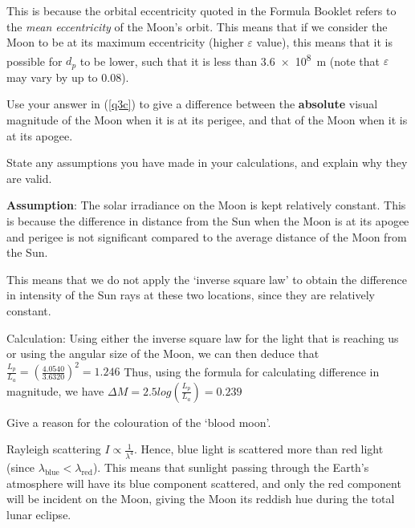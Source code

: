 \documentclass[a4paper,11pt,draft]{exam}
\begin{document}
\begin{questions}
\begin{solution}
		This is because the orbital eccentricity quoted in the Formula Booklet refers to the \textit{mean eccentricity} of the Moon’s orbit. This means that if we consider the Moon to be at its maximum eccentricity (higher $ \varepsilon $ value), this means that it is possible for $ d_p $ to be lower, such that it is less than \SI{3.6e8}{\metre} (note that $ \varepsilon $ may vary by up to 0.08).
	\end{solution}

\filbreak
\question[3]
	Use your answer in (\ref{q3c}) to give a difference between the \textbf{absolute} visual magnitude of the Moon when it is at its perigee, and that of the Moon when it is at its apogee. 
	
	State any assumptions you have made in your calculations, and explain why they are valid. 
	\droppoints
	\begin{solution}
		\textbf{Assumption}: The solar irradiance on the Moon is kept relatively constant. This is because the difference in distance from the Sun when the Moon is at its apogee and perigee is not significant compared to the average distance of the Moon from the Sun. 
		
		This means that we do not apply the `inverse square law' to obtain the difference in intensity of the Sun rays at these two locations, since they are relatively constant.
		
		Calculation: Using either the inverse square law for the light that is reaching us or using the angular size of the Moon, we can then deduce that 
		$\displaystyle \frac{L_p}{L_a}=\left(\frac{4.0540}{3.6320}\right)^2=1.246 $
		Thus, using the formula for calculating difference in magnitude, we have 
		$\displaystyle \Delta M = 2.5 log \left(\frac{L_p}{L_a}\right) = 0.239 $
	\end{solution}


\question[1]
	\vspace{-10pt}
	Give a reason for the colouration of the `blood moon'. 	
	\droppoints
	\begin{solution}
		Rayleigh scattering $\displaystyle I \propto \frac{1}{\lambda^4} $. Hence, blue light is scattered more than red light (since $ \lambda_\text{blue} < \lambda_\text{red} $).  This means that sunlight passing through the Earth's atmosphere will have its blue component scattered, and only the red component will be incident on the Moon, giving the Moon its reddish hue during the total lunar eclipse.
	\end{solution}
	

\end{questions}
\end{document}
